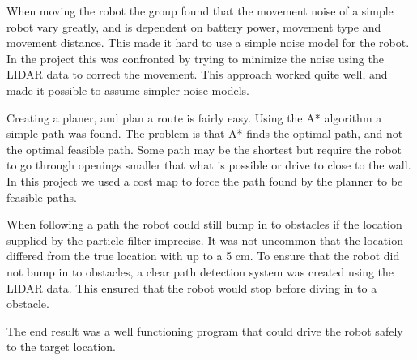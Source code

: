 When moving the robot the group found that the movement noise of a simple robot vary greatly, and is dependent on battery power, movement type and movement distance. This made it hard to use a simple noise model for the robot. In the project this was confronted by trying to minimize the noise using the LIDAR data to correct the movement. This approach worked quite well, and made it possible to assume simpler noise models.

Creating a planer, and plan a route is fairly easy. Using the A* algorithm a simple path was found. The problem is that A* finds the optimal path, and not the optimal feasible path. Some path may be the shortest but require the robot to go through openings smaller that what is possible or drive to close to the wall. In this project we used a cost map to force the path found by the planner to be feasible paths.

When following a path the robot could still bump in to obstacles if the location supplied by the particle filter imprecise. It was not uncommon that the location differed from the true location with up to a 5 cm. To ensure that the robot did not bump in to obstacles, a clear path detection system was created using the LIDAR data. This ensured that the robot would stop before diving in to a obstacle. 

The end result was a well functioning program that could drive the robot safely to the target location. 